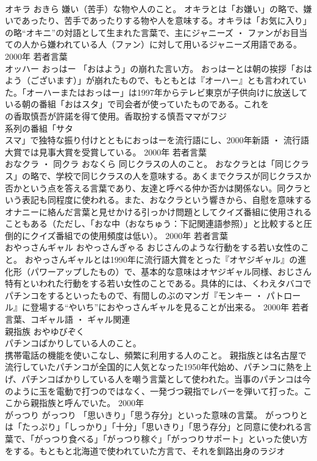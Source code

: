 \documentclass[8pt]{extreport}
\begin{document}
\begin{CJK}{UTF8}{min}
\\	オキラ	おきら	嫌い（苦手）な物や人のこと。	オキラとは「お嫌い」の略で、嫌いであったり、苦手であったりする物や人を意味する。オキラは「お気に入り」の略“オキニ”の対語として生まれた言葉で、主にジャニーズ ・ ファンがお目当ての人から嫌われている人（ファン）に対して用いるジャニーズ用語である。	2000年	若者言葉	
\\	オッハー	おっはー	「おはよう」の崩れた言い方。	おっはーとは朝の挨拶「おはよう（ございます）」が崩れたもので、もともとは『オーハー』とも言われていた。「オーハーまたはおっはー」は1997年からテレビ東京が子供向けに放送している朝の番組「おはスタ」で司会者が使っていたものである。これを
\\	の香取慎吾が許諾を得て使用。香取扮する慎吾ママがフジ
\\	系列の番組「サタ
\\	スマ」で独特な振り付けとともにおっはーを流行語にし、2000年新語 ・ 流行語大賞では見事大賞を受賞している。	2000年	若者言葉	
\\	おなクラ ・ 同クラ	おなくら	同じクラスの人のこと。	おなクラとは「同じクラス」の略で、学校で同じクラスの人を意味する。あくまでクラスが同じクラスか否かという点を答える言葉であり、友達と呼べる仲か否かは関係ない。同クラという表記も同程度に使われる。また、おなクラという響きから、自慰を意味するオナニーに絡んだ言葉と見せかける引っかけ問題としてクイズ番組に使用されることもある（ただし、「おな中（おなちゅう：下記関連語参照）」と比較すると圧倒的にクイズ番組での使用頻度は低い）。	2000年	若者言葉	
\\	おやっさんギャル	おやっさんぎゃる	おじさんのような行動をする若い女性のこと。	おやっさんギャルとは1990年に流行語大賞をとった『オヤジギャル』の進化形（パワーアップしたもの）で、基本的な意味はオヤジギャル同様、おじさん特有といわれた行動をする若い女性のことである。具体的には、くわえタバコでパチンコをするといったもので、有間しのぶのマンガ『モンキー ・ パトロール』に登場する“やいち”におやっさんギャルを見ることが出来る。	2000年	若者言葉、コギャル語 ・ ギャル関連	
\\	親指族	おやゆびぞく	
\\	パチンコばかりしている人のこと。 
\\	携帯電話の機能を使いこなし、頻繁に利用する人のこと。	親指族とは名古屋で流行していたパチンコが全国的に人気となった1950年代始め、パチンコに熱を上げ、パチンコばかりしている人を嘲う言葉として使われた。当事のパチンコは今のように玉を電動で打つのではなく、一発づつ親指でレバーを弾いて打った。ここから親指族と呼んでいた。	2000年	
\\	がっつり	がっつり	「思いきり」「思う存分」といった意味の言葉。	がっつりとは「たっぷり」「しっかり」「十分」「思いきり」「思う存分」と同意に使われる言葉で、「がっつり食べる」「がっつり稼ぐ」「がっつりサポート」といった使い方をする。もともと北海道で使われていた方言で、それを釧路出身のラジオ

\end{CJK}
\end{document}
